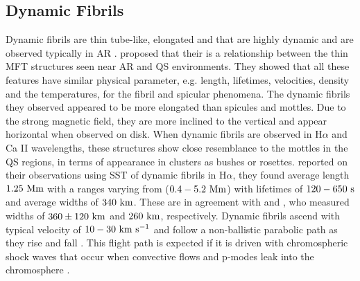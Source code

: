 \documentclass[12pt]{ociamthesis}
\newcommand{\kms}{~\rm{km ~s^{-1}}}
\newcommand{\np}{\\ \\}
\begin{document}
\subsection{Dynamic Fibrils}
\label{subsec:dfibs}
Dynamic fibrils are thin tube-like, elongated and that are highly dynamic and are observed typically in AR \citep{De_Pontieu2007ApJ,Hansteen2006ApJ}. \cite{Foukal1971SoPh1959F,Foukal1971SoPh20298F} proposed that their is a relationship between the thin MFT structures seen near AR and QS environments. They showed that all these features have similar physical parameter, e.g. length, lifetimes, velocities, density and the temperatures, for the fibril and spicular phenomena. The dynamic fibrils they observed appeared to be more elongated than spicules and mottles. Due to the strong magnetic field, they are more inclined to the vertical and appear horizontal when observed on disk. When dynamic fibrils are observed in H$\alpha$ and Ca II wavelengths, these structures show close resemblance to the mottles in the QS regions, in terms of appearance in clusters as bushes or rosettes. \cite{De_Pontieu2007ApJ} reported on their observations using SST of dynamic fibrils in H$\alpha$, they found average length $1.25~\rm{Mm}$ with a ranges varying from ($0.4-5.2~\rm{Mm}$) with lifetimes of $120-650~\rm{s}$ and average widths of $340~\rm{km}$. These are in agreement with \cite{Morton2012NatCo31315M} and \cite{Gafeira2017ApJS2297G}, who measured widths of $360\pm120~\rm{km}$ and $260~\rm{km}$, respectively. Dynamic fibrils ascend with typical velocity of $10-30\kms$ and follow a non-ballistic parabolic path as they rise and fall \cite{Beckers1968}. This flight path is expected if it is driven with chromospheric shock waves that occur when convective flows and p-modes leak into the chromosphere \citep{Langangen2008ApJ6731194L,De_Pontieu2007ApJ}. \np 
\end{document}
